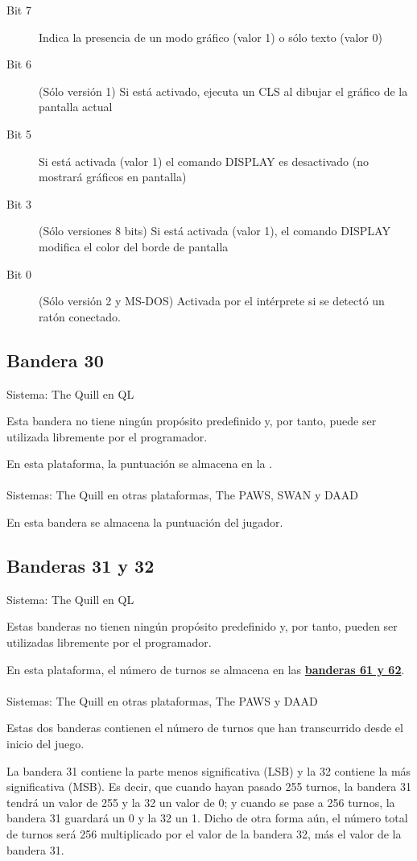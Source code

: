 \documentclass[11pt, a5paper]{article}
\newcommand{\quill}{\textsf{The Quill}\xspace}
\newcommand{\paw}{\textsf{The PAWS}\xspace}
\newcommand{\swan}{\textsf{SWAN}\xspace}
\newcommand{\daad}{\textsf{DAAD}\xspace}
\newcommand{\sistema}[1]{\noindent Sistema: #1 \nopagebreak}
\newcommand{\sistemas}[1]{\noindent Sistemas: #1 \nopagebreak}
\begin{document}
\begin{description}
  \item[Bit 7] Indica la presencia de un modo gráfico (valor 1) o sólo texto (valor 0)
  \item[Bit 6] (Sólo versión 1) Si está activado, ejecuta un CLS al dibujar el gráfico de la pantalla actual
  \item[Bit 5] Si está activada (valor 1) el comando DISPLAY es desactivado (no mostrará gráficos en pantalla)
  \item[Bit 3] (Sólo versiones 8 bits) Si está activada (valor 1), el comando DISPLAY modifica el color del borde de pantalla
  \item[Bit 0] (Sólo versión 2 y MS-DOS) Activada por el intérprete si se detectó un ratón conectado.
\end{description}

\subsection{Bandera 30}

\sistema{\quill en QL}

Esta bandera no tiene ningún propósito predefinido y, por tanto, puede ser utilizada libremente por el programador.

En esta plataforma, la puntuación se almacena en la \textbf{}.
\\\ \\
\sistemas{\quill en otras plataformas, \paw, \swan y \daad}

En esta bandera se almacena la puntuación del jugador.

\subsection{Banderas 31 y 32}

\sistema{\quill en QL}

Estas banderas no tienen ningún propósito predefinido y, por tanto, pueden ser utilizadas libremente por el programador.

En esta plataforma, el número de turnos se almacena en las \hyperref[flag61]{\textbf{banderas 61 y 62}}.
\\\ \\
\sistemas{\quill en otras plataformas, \paw y \daad}

Estas dos banderas contienen el número de turnos que han transcurrido desde el inicio del juego.

La bandera 31 contiene la parte menos significativa (LSB) y la 32 contiene la más significativa (MSB). Es decir, que cuando hayan pasado 255 turnos, la bandera 31 tendrá un valor de 255 y la 32 un valor de 0; y cuando se pase a 256 turnos, la bandera 31 guardará un 0 y la 32 un 1. Dicho de otra forma aún, el número total de turnos será 256 multiplicado por el valor de la bandera 32, más el valor de la bandera 31.
\end{document}
